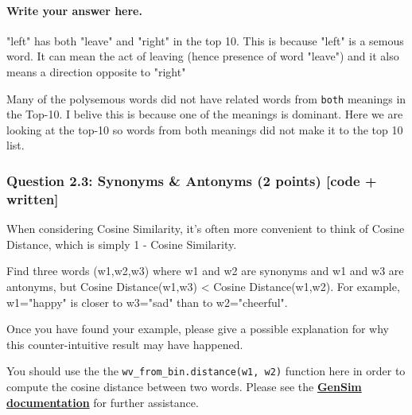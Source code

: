 \documentclass[11pt]{article}
\begin{document}
    \paragraph{Write your answer here.}\label{write-your-answer-here.}

"left" has both "leave" and "right" in the top 10. This is because
"left" is a semous word. It can mean the act of leaving (hence presence
of word "leave") and it also means a direction opposite to "right"

Many of the polysemous words did not have related words from
\texttt{both} meanings in the Top-10. I belive this is because one of
the meanings is dominant. Here we are looking at the top-10 so words
from both meanings did not make it to the top 10 list.

    \subsubsection{Question 2.3: Synonyms \& Antonyms (2 points) {[}code +
written{]}}\label{question-2.3-synonyms-antonyms-2-points-code-written}

When considering Cosine Similarity, it's often more convenient to think
of Cosine Distance, which is simply 1 - Cosine Similarity.

Find three words (w1,w2,w3) where w1 and w2 are synonyms and w1 and w3
are antonyms, but Cosine Distance(w1,w3) \textless{} Cosine
Distance(w1,w2). For example, w1="happy" is closer to w3="sad" than to
w2="cheerful".

Once you have found your example, please give a possible explanation for
why this counter-intuitive result may have happened.

You should use the the \texttt{wv\_from\_bin.distance(w1,\ w2)} function
here in order to compute the cosine distance between two words. Please
see the
\textbf{\href{https://radimrehurek.com/gensim/models/keyedvectors.html\#gensim.models.keyedvectors.FastTextKeyedVectors.distance}{GenSim
documentation}} for further assistance.
\end{document}
